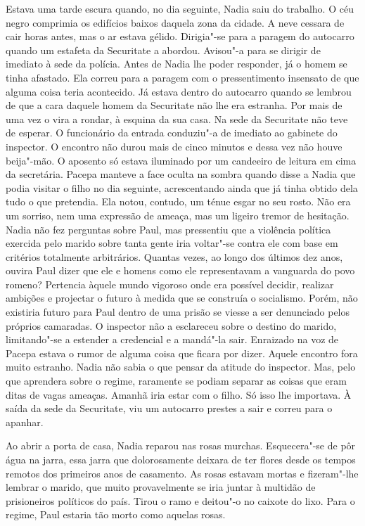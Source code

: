 Estava uma tarde escura quando, no dia seguinte, Nadia saiu do trabalho.
O céu negro comprimia os edifícios baixos daquela zona da cidade. A
neve cessara de cair horas antes, mas o ar estava gélido. Dirigia"-se
para a paragem do autocarro quando um estafeta da Securitate a abordou.
Avisou"-a para se dirigir de imediato à sede da polícia. Antes de Nadia
lhe poder responder, já o homem se tinha afastado. Ela correu para a
paragem com o pressentimento insensato de que alguma coisa teria
acontecido. Já estava dentro do autocarro quando se lembrou de que a
cara daquele homem da Securitate não lhe era estranha. Por mais de uma
vez o vira a rondar, à esquina da sua casa. Na sede da Securitate não
teve de esperar. O funcionário da entrada conduziu"-a de imediato ao
gabinete do inspector. O encontro não durou mais de cinco minutos e
dessa vez não houve beija"-mão. O aposento só estava iluminado por um
candeeiro de leitura em cima da secretária. Pacepa manteve a face
oculta na sombra quando disse a Nadia que podia visitar o filho no dia
seguinte, acrescentando ainda que já tinha obtido dela tudo o que
pretendia. Ela notou, contudo, um ténue esgar no seu rosto. Não era um
sorriso, nem uma expressão de ameaça, mas um ligeiro tremor de
hesitação. Nadia não fez perguntas sobre Paul, mas pressentiu que a
violência política exercida pelo marido sobre tanta gente iria voltar"-se
contra ele com base em critérios totalmente arbitrários. Quantas vezes,
ao longo dos últimos dez anos, ouvira Paul dizer que ele e homens como
ele representavam a vanguarda do povo romeno? Pertencia àquele mundo
vigoroso onde era possível decidir, realizar ambições e projectar o
futuro à medida que se construía o socialismo. Porém, não existiria
futuro para Paul dentro de uma prisão se viesse a ser denunciado pelos
próprios camaradas. O inspector não a esclareceu sobre o destino do
marido, limitando"-se a estender a credencial e a mandá"-la sair.
Enraizado na voz de Pacepa estava o rumor de alguma coisa que ficara por
dizer. Aquele encontro fora muito estranho. Nadia não sabia o que pensar
da atitude do inspector. Mas, pelo que aprendera sobre o regime,
raramente se podiam separar as coisas que eram ditas de vagas ameaças.
Amanhã iria estar com o filho. Só isso lhe importava. À saída da sede da
Securitate, viu um autocarro prestes a sair e correu para o apanhar.

Ao abrir a porta de casa, Nadia reparou nas rosas murchas.
Esquecera"-se de pôr água na jarra, essa jarra que dolorosamente deixara
de ter flores desde os tempos remotos dos primeiros anos de casamento.
As rosas estavam mortas e fizeram"-lhe lembrar o marido, que muito provavelmente se iria juntar à multidão de prisioneiros políticos
do país. Tirou o ramo e deitou"-o no caixote do lixo. Para o regime, Paul
estaria tão morto como aquelas rosas.

